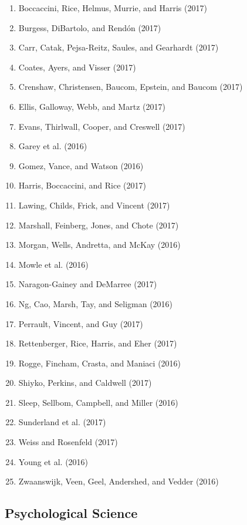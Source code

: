 \documentclass[english,man]{apa6}
\providecommand{\tightlist}{%
  \setlength{\itemsep}{0pt}\setlength{\parskip}{0pt}}
\begin{document}
\begin{enumerate}
\def\labelenumi{\arabic{enumi})}
\tightlist
\item
  Boccaccini, Rice, Helmus, Murrie, and Harris (2017)
\item
  Burgess, DiBartolo, and Rendón (2017)
\item
  Carr, Catak, Pejsa-Reitz, Saules, and Gearhardt (2017)
\item
  Coates, Ayers, and Visser (2017)
\item
  Crenshaw, Christensen, Baucom, Epstein, and Baucom (2017)
\item
  Ellis, Galloway, Webb, and Martz (2017)
\item
  Evans, Thirlwall, Cooper, and Creswell (2017)
\item
  Garey et al. (2016)
\item
  Gomez, Vance, and Watson (2016)
\item
  Harris, Boccaccini, and Rice (2017)
\item
  Lawing, Childs, Frick, and Vincent (2017)
\item
  Marshall, Feinberg, Jones, and Chote (2017)
\item
  Morgan, Wells, Andretta, and McKay (2016)
\item
  Mowle et al. (2016)
\item
  Naragon-Gainey and DeMarree (2017)
\item
  Ng, Cao, Marsh, Tay, and Seligman (2016)
\item
  Perrault, Vincent, and Guy (2017)
\item
  Rettenberger, Rice, Harris, and Eher (2017)
\item
  Rogge, Fincham, Crasta, and Maniaci (2016)
\item
  Shiyko, Perkins, and Caldwell (2017)
\item
  Sleep, Sellbom, Campbell, and Miller (2016)
\item
  Sunderland et al. (2017)
\item
  Weiss and Rosenfeld (2017)
\item
  Young et al. (2016)
\item
  Zwaanswijk, Veen, Geel, Andershed, and Vedder (2016)
\end{enumerate}

\subsection{Psychological Science}\label{psychological-science}
\end{document}
